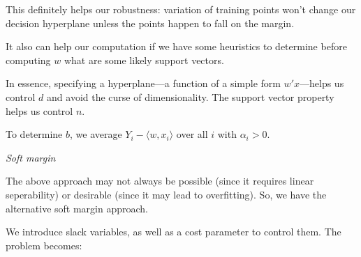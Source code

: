 \documentclass{minimal}
\begin{document}
This definitely helps our robustness: 
variation of training points won't change our decision hyperplane unless the
points happen to fall on the margin. 

It also can help our computation if we have
some heuristics to determine before computing $w$ what are some likely support
vectors.

In essence, specifying a hyperplane---a function of a simple form $w'x$---helps
us control $d$ and avoid the curse of dimensionality. The support vector
property helps us control $n$.

To determine $b$, we average $Y_i - \langle w, x_i \rangle$ over all $i$ with
$\alpha_i > 0$.

\medskip

\textit{Soft margin}

The above approach may not always be possible (since it requires linear
seperability) or desirable (since it may lead to overfitting). So, we have the
alternative soft margin approach.

We introduce slack variables, as well as a cost parameter to control them. The
problem becomes:
\end{document}
